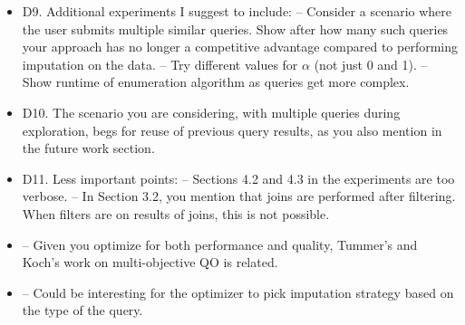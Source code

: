 \documentclass[draft,12pt]{article}
\newcommand{\resp}[1]{{\color{blue}{#1}}}
\begin{document}
\begin{itemize}
\item D9. Additional experiments I suggest to include:
-- Consider a scenario where the user submits multiple similar queries. Show after how many such queries your approach has no longer a competitive advantage compared to performing imputation on the data.
-- Try different values for $\alpha$ (not just 0 and 1).
-- Show runtime of enumeration algorithm as queries get more complex.

\item D10. The scenario you are considering, with multiple queries during exploration, begs for reuse of previous query results, as you also mention in the future work section.

\item D11. Less important points:
-- Sections 4.2 and 4.3 in the experiments are too verbose.
-- In Section 3.2, you mention that joins are performed after filtering. When filters are on results of joins, this is not possible.

\item -- Given you optimize for both performance and quality, Tummer's and Koch's work on multi-objective QO is related.

  \resp{Yes, Tummer \& Koch is closely related. However, much of the complexity of their paper is in dealing with cost functions which are not well behaved. Our cost functions are both monotonic, which allows us to use a simpler optimizer than what Tummer \& Koch propose.}

\item -- Could be interesting for the optimizer to pick imputation strategy based on the type of the query.
\end{itemize}
\end{document}
